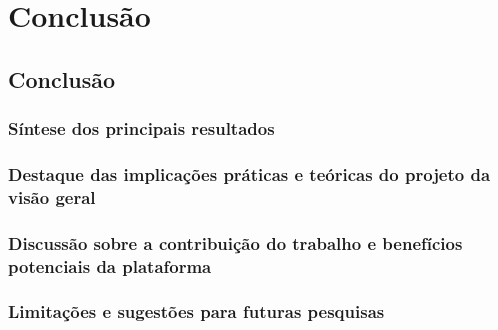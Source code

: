 \part{Conclusão}
\chapter{Conclusão}

\section{Síntese dos principais resultados}



\section{Destaque das implicações práticas e teóricas do projeto da visão geral}


\section{Discussão sobre a contribuição do trabalho e benefícios potenciais da plataforma}

\section{Limitações e sugestões para futuras pesquisas}